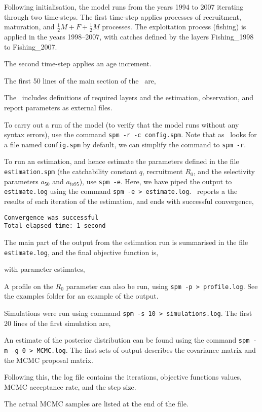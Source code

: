 Following initialisation, the model runs from the years 1994 to 2007 iterating through two time-steps. The first time-step applies processes of recruitment, maturation, and  $\frac{1}{2} M + F + \frac{1}{2} M$ processes. The exploitation process (fishing) is applied in the years 1998--2007, with catches defined by the layers Fishing\_1998 to Fishing\_2007. 

The second time-step applies an age increment.

The first 50 lines of the main section of the \config\ are,
 

The \config\ includes definitions of required layers and the estimation, observation, and report parameters as external files.

To carry out a run of the model (to verify that the model runs without any syntax errors), use the command \texttt{spm -r -c config.spm}. Note that as \SPM\ looks for a file named \texttt{config.spm} by default, we can simplify the command to \texttt{spm -r}. 

To run an estimation, and hence estimate the parameters defined in the file \texttt{estimation.spm} (the catchability constant $q$, recruitment $R_0$, and the selectivity parameters $a_{50}$ and $a_{to95}$), use  \texttt{spm -e}. Here, we have piped the output to \texttt{estimate.log} using the command \texttt{spm -e > estimate.log}.  \SPM\ reports a the results of each iteration of the estimation, and ends with successful convergence,
{\small{\begin{verbatim}
Convergence was successful
Total elapsed time: 1 second
\end{verbatim}}}

The main part of the output from the estimation run is summarised in the file \texttt{estimate.log}, and the final objective function is,
 
with parameter estimates,
 

A profile on the $R_0$ parameter can also be run, using \texttt{spm -p > profile.log}. See the examples folder for an example of the output.

Simulations were run using command \texttt{spm -s 10 > simulations.log}. The first 20 lines of the first simulation are,
 

An estimate of the posterior distribution can be found using the command \texttt{spm -m -g 0 > MCMC.log}. The first sets of output describes the covariance matrix and the MCMC proposal matrix.


Following this, the log file contains the iterations, objective functions values, MCMC acceptance rate, and the step size.


The actual MCMC samples are listed at the end of the file.


